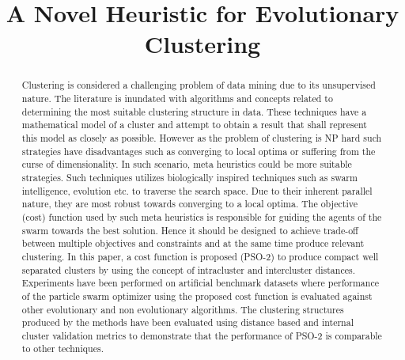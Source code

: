 \documentclass[conference]{IEEEtran}
\begin{document}
\title{A Novel Heuristic for Evolutionary Clustering}


\author{
\and
{}
}




\maketitle

\begin{abstract}
Clustering is considered a challenging problem of data mining due to its unsupervised nature. The literature is inundated with algorithms and concepts related to determining the most suitable clustering structure in data. These techniques have a mathematical model of a cluster and attempt to obtain a result that shall represent this model as closely as possible. However as the problem of clustering is NP hard such strategies have disadvantages such as converging to local optima or suffering from the curse of dimensionality. In such scenario, meta heuristics could be more suitable strategies. Such techniques utilizes biologically inspired techniques such as swarm intelligence, evolution etc. to traverse the search space. Due to their inherent parallel nature, they are most robust towards converging to a local optima. The objective (cost) function used by such meta heuristics is responsible for guiding the agents of the swarm towards the best solution. Hence it should be designed to achieve trade-off between multiple objectives and constraints and at the same time produce relevant clustering. In this paper, a cost function is proposed (PSO-2) to produce compact well separated clusters by using the concept of intracluster and intercluster distances. Experiments have been performed on artificial benchmark datasets where performance of the particle swarm optimizer using the proposed cost function is evaluated against other evolutionary and non evolutionary algorithms. The clustering structures produced by the  methods have been evaluated using distance based and internal cluster validation metrics to demonstrate that the performance of PSO-2 is comparable to other techniques.  \\
\end{abstract}
\end{document}
